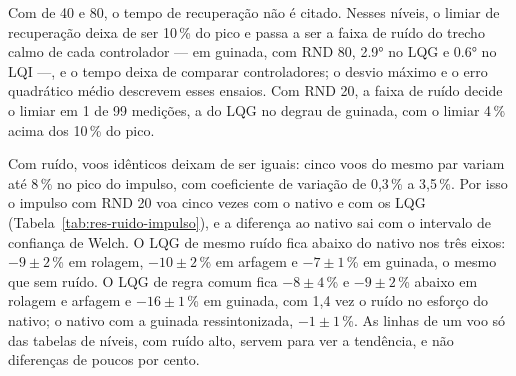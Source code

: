 \begin{table}[htbp]
\centering
\caption{Níveis de ruído de giroscópio, em rolagem.}
\label{tab:res-niveis-rolagem}
\small
\resizebox{\textwidth}{!}{}

\nota{\raggedright }
\end{table}

\begin{table}[htbp]
\centering
\caption{Níveis de ruído de giroscópio, em guinada.}
\label{tab:res-niveis-guinada}
\small
\resizebox{\textwidth}{!}{}

\nota{\raggedright }
\end{table}

Com  de 40 e 80, o tempo de recuperação não é citado.
Nesses níveis, o limiar de recuperação deixa de ser 10\,\% do pico e passa a
ser a faixa de ruído do trecho calmo de cada controlador --- em guinada, com
RND 80, \ang{2.9} no LQG e \ang{0.6} no LQI ---, e o tempo deixa de comparar
controladores; o desvio máximo e o erro quadrático médio descrevem esses
ensaios. Com RND 20, a faixa de ruído decide o limiar em 1 de 99 medições,
a do LQG no degrau de guinada, com o limiar 4\,\% acima dos 10\,\% do pico.

\begin{table}[htbp]
\centering
\caption{Impulso de torque com  = 20, em voos
repetidos.}
\label{tab:res-ruido-impulso}
\small
\resizebox{\textwidth}{!}{}

\nota{\raggedright }
\end{table}

Com ruído, voos idênticos deixam de ser iguais: cinco voos do mesmo par
variam até 8\,\% no pico do impulso, com coeficiente de variação de 0,3\,\% a
3,5\,\%. Por isso o impulso com RND 20 voa cinco vezes com o nativo e com os
LQG (Tabela~\ref{tab:res-ruido-impulso}), e a diferença ao nativo sai com o
intervalo de confiança de Welch. O LQG de mesmo ruído fica abaixo do nativo
nos três eixos: $-9 \pm 2$\,\% em rolagem, $-10 \pm 2$\,\% em arfagem e
$-7 \pm 1$\,\% em guinada, o mesmo que sem ruído. O LQG de regra comum fica
$-8 \pm 4$\,\% e $-9 \pm 2$\,\% abaixo em rolagem e arfagem e
$-16 \pm 1$\,\% em guinada, com 1,4 vez o ruído no esforço do nativo; o
nativo com a guinada ressintonizada, $-1 \pm 1$\,\%. As linhas de um voo só
das tabelas de níveis, com ruído alto, servem para ver a tendência, e não
diferenças de poucos por cento.

